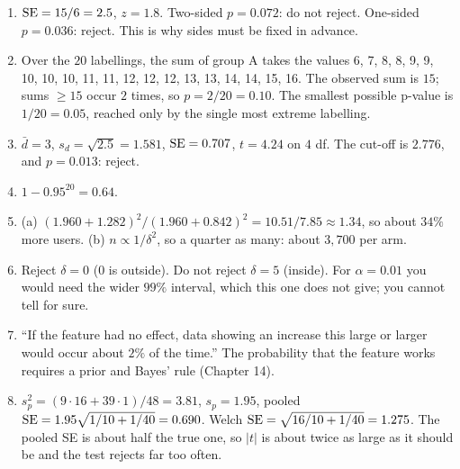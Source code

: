 \begin{enumerate}
\item $\operatorname{SE}=15/6=2.5$, $z=1.8$. Two-sided $p=0.072$: do not reject. One-sided
$p=0.036$: reject. This is why sides must be fixed in advance.
\item Over the $20$ labellings, the sum of group A takes the values
6, 7, 8, 8, 9, 9, 10, 10, 10, 11, 11, 12, 12, 12, 13, 13, 14, 14, 15, 16.
The observed sum is $15$; sums $\ge15$ occur $2$ times, so $p=2/20=0.10$. The smallest
possible p-value is $1/20=0.05$, reached only by the single most extreme labelling.
\item $\bar d=3$, $s_d=\sqrt{2.5}=1.581$, $\operatorname{SE}=0.707$, $t=4.24$ on $4$ df. The cut-off is
$2.776$, and $p=0.013$: reject.
\item $1-0.95^{20}=0.64$.
\item (a) $(1.960+1.282)^2/(1.960+0.842)^2=10.51/7.85\approx1.34$, so about $34\%$ more
users. (b) $n\propto1/\delta^2$, so a quarter as many: about $3{,}700$ per arm.
\item Reject $\delta=0$ ($0$ is outside). Do not reject $\delta=5$ (inside). For
$\alpha=0.01$ you would need the wider $99\%$ interval, which this one does not give;
you cannot tell for sure.
\item ``If the feature had no effect, data showing an increase this large or larger
would occur about $2\%$ of the time.'' The probability that the feature works
requires a prior and Bayes' rule (Chapter 14).
\item $s_p^2=(9\cdot16+39\cdot1)/48=3.81$, $s_p=1.95$, pooled
$\operatorname{SE}=1.95\sqrt{1/10+1/40}=0.690$. Welch $\operatorname{SE}=\sqrt{16/10+1/40}=1.275$. The pooled SE is
about half the true one, so $|t|$ is about twice as large as it should be and the test
rejects far too often.
\end{enumerate}
